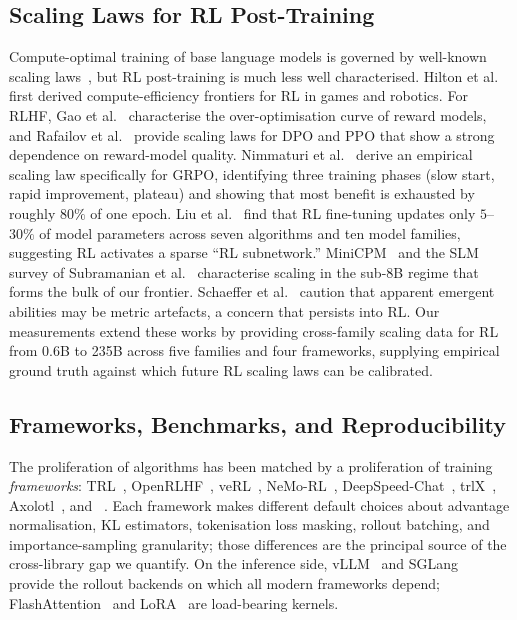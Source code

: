 \subsection{Scaling Laws for RL Post-Training}
\label{sec:related:scaling}

Compute-optimal training of base language models is governed by
well-known scaling laws~\cite{kaplan2020scalinglaws, hoffmann2022chinchilla,
muennighoff2023datascaling}, but RL post-training is much less well
characterised. Hilton et al.~\cite{hilton2023rlscaling} first derived
compute-efficiency frontiers for RL in games and robotics. For RLHF,
Gao et al.~\cite{gao2023reward} characterise the over-optimisation curve of
reward models, and Rafailov et al.~\cite{rafailov2024rlhfscaling} provide
scaling laws for DPO and PPO that show a strong dependence on reward-model
quality. Nimmaturi et al.~\cite{nimmaturi2025scalinglaws} derive an
empirical scaling law specifically for GRPO, identifying three training
phases (slow start, rapid improvement, plateau) and showing that most
benefit is exhausted by roughly $80\%$ of one epoch. Liu et
al.~\cite{liu2025rlsubnetworks} find that RL fine-tuning updates only
$5$--$30\%$ of model parameters across seven algorithms and ten model
families, suggesting RL activates a sparse ``RL subnetwork.''
MiniCPM~\cite{hu2024minicpm} and the SLM survey of
Subramanian et al.~\cite{subramanian2025slm} characterise scaling in the
sub-8B regime that forms the bulk of our frontier. Schaeffer et
al.~\cite{schaeffer2024emergent} caution that apparent emergent abilities may
be metric artefacts, a concern that persists into RL. Our measurements
extend these works by providing cross-family scaling data for RL from
0.6B to 235B across five families and four frameworks, supplying empirical
ground truth against which future RL scaling laws can be calibrated.

\subsection{Frameworks, Benchmarks, and Reproducibility}
\label{sec:related:frameworks}

The proliferation of algorithms has been matched by a proliferation of
training \emph{frameworks}: TRL~\cite{vonwerra2022trl},
OpenRLHF~\cite{hu2024openrlhf}, veRL~\cite{sheng2024verl},
NeMo-RL~\cite{nvidia2024nemorl}, DeepSpeed-Chat~\cite{yao2023deepspeedchat},
trlX~\cite{havrilla2023trlx}, Axolotl~\cite{axolotl2024}, and
\tinker{}~\cite{thinkingmachines2024tinker}. Each framework makes different
default choices about advantage normalisation, KL estimators, tokenisation
loss masking, rollout batching, and importance-sampling granularity; those
differences are the principal source of the cross-library gap we quantify.
On the inference side, vLLM~\cite{kwon2023vllm} and
SGLang~\cite{zheng2024sglang} provide the rollout backends on which all
modern frameworks depend; FlashAttention~\cite{dao2022flashattention} and
LoRA~\cite{hu2022lora} are load-bearing kernels.

